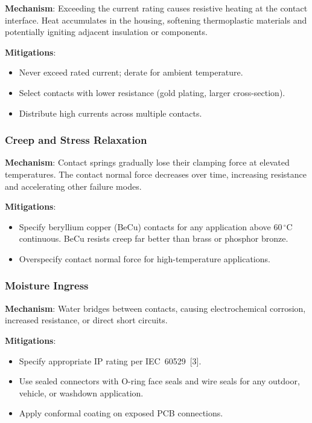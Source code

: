 \documentclass[11pt,letterpaper,twoside,openany]{book}
\newcommand{\degC}{\ensuremath{{}^{\circ}\text{C}}}
\begin{document}
\textbf{Mechanism}: Exceeding the current rating causes resistive heating at the contact interface. Heat accumulates in the housing, softening thermoplastic materials and potentially igniting adjacent insulation or components.

\textbf{Mitigations}:
\begin{itemize}[nosep,leftmargin=1.5em]
  \item Never exceed rated current; derate for ambient temperature.
  \item Select contacts with lower resistance (gold plating, larger cross-section).
  \item Distribute high currents across multiple contacts.
\end{itemize}

\subsubsection{Creep and Stress Relaxation}

\textbf{Mechanism}: Contact springs gradually lose their clamping force at elevated temperatures. The contact normal force decreases over time, increasing resistance and accelerating other failure modes.

\textbf{Mitigations}:
\begin{itemize}[nosep,leftmargin=1.5em]
  \item Specify beryllium copper (BeCu) contacts for any application above 60\,\degC{} continuous. BeCu resists creep far better than brass or phosphor bronze.
  \item Overspecify contact normal force for high-temperature applications.
\end{itemize}

\subsubsection{Moisture Ingress}

\textbf{Mechanism}: Water bridges between contacts, causing electrochemical corrosion, increased resistance, or direct short circuits.

\textbf{Mitigations}:
\begin{itemize}[nosep,leftmargin=1.5em]
  \item Specify appropriate IP rating per IEC~60529~[3].
  \item Use sealed connectors with O-ring face seals and wire seals for any outdoor, vehicle, or washdown application.
  \item Apply conformal coating on exposed PCB connections.
\end{itemize}
\end{document}

